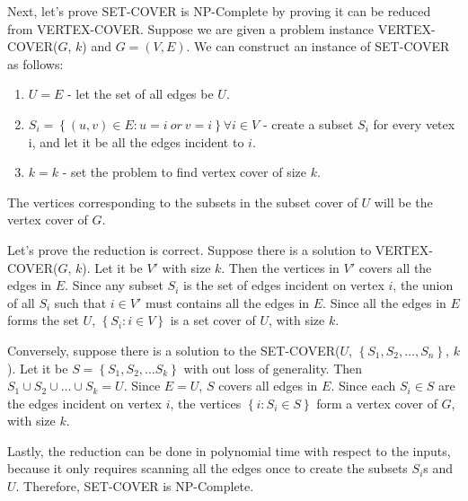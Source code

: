 \documentclass{article}
\begin{document}
Next, let's prove SET-COVER is NP-Complete by proving it can be reduced from
VERTEX-COVER. Suppose we are given a problem instance VERTEX-COVER($G$, $k$)
and $G = (V, E)$. We can construct an instance of SET-COVER as follows:
\begin{enumerate}
\item $U = E$ - let the set of all edges be $U$.
\item $S_i = \left\{ (u, v) \in E : u = i~or~v = i  \right\} \forall i \in V$
	- create a subset $S_i$ for every vetex i, and let it be all the edges 
	incident to $i$.
\item $k = k$ - set the problem to find vertex cover of size $k$.
\end{enumerate}
The vertices corresponding to the subsets in the subset cover of $U$ will be 
the vertex cover of $G$.

Let's prove the reduction is correct. Suppose there is a solution to
VERTEX-COVER($G$, $k$). Let it be $V'$ with size $k$. 
Then the vertices in $V'$ covers all
the edges in $E$. Since any subset $S_i$ is the set of edges incident on vertex
$i$, the union of all $S_i$ such that $i \in V'$ must contains all the edges
in $E$. Since all the edges in $E$ forms the set $U$, 
$\left\{ S_i : i \in V \right\}$ is a set cover of $U$, with size $k$.

Conversely, suppose there is a solution to the SET-COVER($U$, $\left\{ S_1,
S_2, \dots, S_n\right\}$, $k$). Let it be 
$S = \left\{ S_1, S_2, \dots S_k \right\}$ with out loss of generality.
Then $S_1 \cup S_2 \cup \dots \cup S_k = U$. Since $E = U$, $S$ covers all
edges in $E$. Since each $S_i \in S$ are the edges incident on vertex $i$, 
the vertices $\left\{ i : S_i \in S \right\}$ form a vertex cover of $G$,
with size $k$.

Lastly, the reduction can be done in polynomial time with respect to the inputs, 
because it only requires scanning all the edges once to create the subsets
$S_i$s and $U$. Therefore, SET-COVER is NP-Complete.
\end{document}
